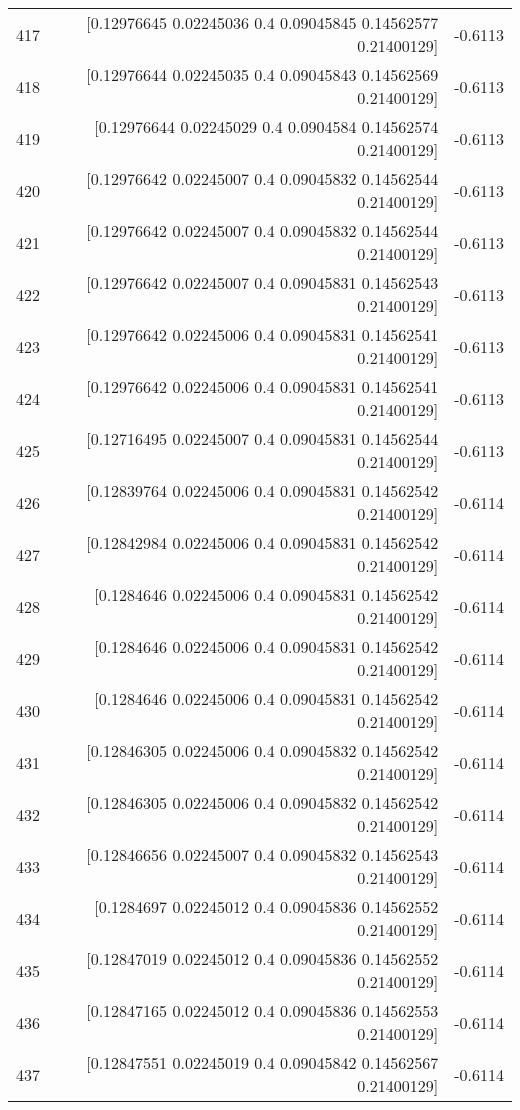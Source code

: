 \begin{longtable}{lrr}
417 & [0.12976645 0.02245036 0.4        0.09045845 0.14562577 0.21400129] & -0.6113 \\
418 & [0.12976644 0.02245035 0.4        0.09045843 0.14562569 0.21400129] & -0.6113 \\
419 & [0.12976644 0.02245029 0.4        0.0904584  0.14562574 0.21400129] & -0.6113 \\
420 & [0.12976642 0.02245007 0.4        0.09045832 0.14562544 0.21400129] & -0.6113 \\
421 & [0.12976642 0.02245007 0.4        0.09045832 0.14562544 0.21400129] & -0.6113 \\
422 & [0.12976642 0.02245007 0.4        0.09045831 0.14562543 0.21400129] & -0.6113 \\
423 & [0.12976642 0.02245006 0.4        0.09045831 0.14562541 0.21400129] & -0.6113 \\
424 & [0.12976642 0.02245006 0.4        0.09045831 0.14562541 0.21400129] & -0.6113 \\
425 & [0.12716495 0.02245007 0.4        0.09045831 0.14562544 0.21400129] & -0.6113 \\
426 & [0.12839764 0.02245006 0.4        0.09045831 0.14562542 0.21400129] & -0.6114 \\
427 & [0.12842984 0.02245006 0.4        0.09045831 0.14562542 0.21400129] & -0.6114 \\
428 & [0.1284646  0.02245006 0.4        0.09045831 0.14562542 0.21400129] & -0.6114 \\
429 & [0.1284646  0.02245006 0.4        0.09045831 0.14562542 0.21400129] & -0.6114 \\
430 & [0.1284646  0.02245006 0.4        0.09045831 0.14562542 0.21400129] & -0.6114 \\
431 & [0.12846305 0.02245006 0.4        0.09045832 0.14562542 0.21400129] & -0.6114 \\
432 & [0.12846305 0.02245006 0.4        0.09045832 0.14562542 0.21400129] & -0.6114 \\
433 & [0.12846656 0.02245007 0.4        0.09045832 0.14562543 0.21400129] & -0.6114 \\
434 & [0.1284697  0.02245012 0.4        0.09045836 0.14562552 0.21400129] & -0.6114 \\
435 & [0.12847019 0.02245012 0.4        0.09045836 0.14562552 0.21400129] & -0.6114 \\
436 & [0.12847165 0.02245012 0.4        0.09045836 0.14562553 0.21400129] & -0.6114 \\
437 & [0.12847551 0.02245019 0.4        0.09045842 0.14562567 0.21400129] & -0.6114 \\

\end{longtable}
